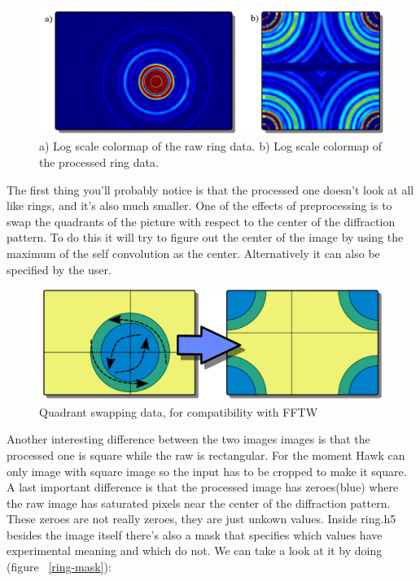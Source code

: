 \documentclass{report}
\begin{document}




\begin{figure}[htp]
\centering
\includegraphics[scale=0.3]{ring_data_comparison.png}
\caption{a) Log scale colormap of the raw ring data. b) Log scale colormap of the processed ring data.}
\label{data-comparision}
\end{figure}

The first thing you'll probably notice is that the processed one doesn't look at all like rings, and it's also much smaller.
One of the effects of preprocessing is to swap the quadrants of the picture with respect to the center of the diffraction pattern.
To do this it will try to figure out the center of the image by using the maximum of the self convolution as the center.
Alternatively it can also be specified by the user.

\begin{figure}[htp]
\centering
\includegraphics[scale=0.25]{fft_shift.png}
\caption{Quadrant swapping data, for compatibility with FFTW}
\label{quadrant-swapping}
\end{figure}

Another interesting difference between the two images images is that the processed one is square while the raw is rectangular.
For the moment Hawk can only image with square image so the input has to be cropped to make it square.
A last important difference is that the processed image has zeroes(blue) where the raw image has saturated pixels near the center
of the diffraction pattern. These zeroes are not really zeroes, they are just unkown values. Inside ring.h5 besides the image itself
there's also a mask that specifies which values have experimental meaning and which do not. We can take a look at it by doing (figure ~\ref{ring-mask}):
\end{document}
